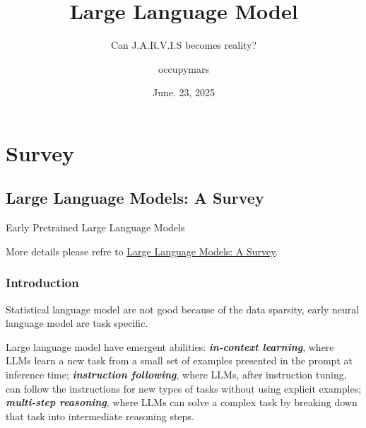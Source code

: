 \documentclass[10pt]{elegantbook}
\title{Large Language Model}
\subtitle{Can J.A.R.V.I.S becomes reality?}
\author{occupymars}
\date{June. 23, 2025}
\newcommand{\mydefination}[1]{\textbf{\textit{\textcolor{structurecolor}{#1}}}}
\begin{document}
\maketitle

\frontmatter
\tableofcontents

\mainmatter

\chapter{Survey}

\section{Large Language Models: A Survey}

\begin{introduction}
    \item Early Pretrained Large Language Models
\end{introduction}

More details please refre to \href{https://arxiv.org/abs/2402.06196}{Large Language Models: A Survey}.

\subsection{Introduction}
Statistical language model are not good because of the data sparsity, early neural language model are task specific.

Large language model have emergent abilities: \mydefination{in-context learning}, where LLMs learn a new task from a small 
set of examples presented in the prompt at inference time; \mydefination{instruction following}, where
LLMs, after instruction tuning, can follow the instructions for new types of tasks without using explicit examples;
\mydefination{multi-step reasoning}, where LLMs can solve a complex task by breaking down that task into intermediate 
reasoning steps.
\end{document}
